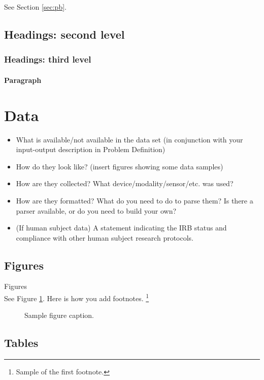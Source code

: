 \documentclass{article}
\begin{document}
See Section \ref{sec:pb}.

\subsection{Headings: second level}


\subsubsection{Headings: third level}


\paragraph{Paragraph}


\section{Data}
\label{sec:Data}

\begin{itemize}
\item What is available/not available in the data set (in conjunction with your input-output description in Problem Definition)
\item How do they look like? (insert figures showing some data samples)
\item How are they collected? What device/modality/sensor/etc. was used?
\item How are they formatted? What do you need to do to parse them? Is there a parser available, or do you need to build your own?
\item (If human subject data) A statement indicating the IRB status and compliance with other human subject research protocols.
\end{itemize}

\subsection{Figures}
Figures \\
See Figure \ref{fig:fig1}. Here is how you add footnotes. \footnote{Sample of the first footnote.}


\begin{figure}
  \centering
  \fbox{\rule[-.5cm]{4cm}{4cm} \rule[-.5cm]{4cm}{0cm}}
  \caption{Sample figure caption.}
  \label{fig:fig1}
\end{figure}

\subsection{Tables}
\end{document}
